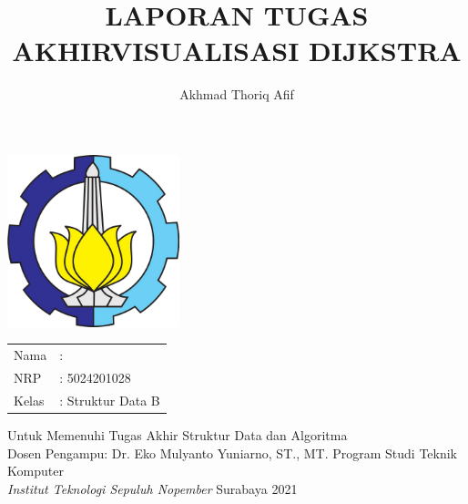 \documentclass[12pt,a4paper,oneside]{article}
\title{\large{\textbf{LAPORAN TUGAS AKHIR}\linebreak \textbf{VISUALISASI DIJKSTRA}\linebreak}}
\date{}
\begin{document}
\begin{titlepage}
\maketitle
\begin{center}
\includegraphics[width=5cm,height=5cm]{images/logo-its.png}
\end{center}
\begin{center}
\end{center}
\vspace{0.5 cm}
\begin{center}
\begin{tabular}{l l}
Nama & : \author{Akhmad Thoriq Afif}\\
NRP & : 5024201028\\
Kelas & : Struktur Data B\\
\end{tabular}
\end{center}
\vspace{0.5 cm}
\begin{center}
Untuk Memenuhi Tugas Akhir Struktur Data dan Algoritma \\
Dosen Pengampu: Dr. Eko Mulyanto Yuniarno, ST., MT. \linebreak
\mbox{}
\vfill
Program Studi Teknik Komputer \\
\textit {Institut Teknologi Sepuluh Nopember}
\linebreak
Surabaya 2021 \linebreak
\end{center}
\end{titlepage}
\newpage
\end{document}
